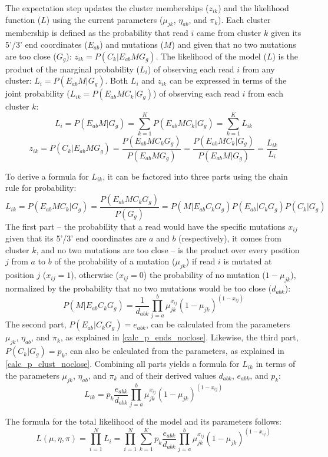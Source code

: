 \documentclass[../../MainTexts/main.tex]{subfiles}
\begin{document}
The expectation step updates the cluster memberships ($z_{ik}$) and the likelihood function ($L$) using the current parameters ($\mu_{jk}$, $\eta_{ab}$, and $\pi_k$).
Each cluster membership is defined as the probability that read $i$ came from cluster $k$ given its 5'/3' end coordinates ($E_{ab}$) and mutations ($M$) and given that no two mutations are too close ($G_g$): $z_{ik} = P(C_k | E_{ab} M G_g)$.
The likelihood of the model ($L$) is the product of the marginal probability ($L_i$) of observing each read $i$ from any cluster: $L_i = P(E_{ab} M | G_g)$.
Both $L_i$ and $z_{ik}$ can be expressed in terms of the joint probability ($L_{ik} = P(E_{ab} M C_k | G_g)$) of observing each read $i$ from each cluster $k$:
$$L_i = P(E_{ab} M | G_g) = \sum_{k=1}^K P(E_{ab} M C_k | G_g) = \sum_{k=1}^K L_{ik}$$
$$z_{ik} = P(C_k | E_{ab} M G_g) = \frac{P(E_{ab} M C_k G_g)}{P(E_{ab} M G_g)} = \frac{P(E_{ab} M C_k | G_g)}{P(E_{ab} M | G_g)} = \frac{L_{ik}}{L_i}$$

To derive a formula for $L_{ik}$, it can be factored into three parts using the chain rule for probability:
$$L_{ik} = P(E_{ab} M C_k | G_g) = \frac{P(E_{ab} M C_k G_g)}{P(G_g)} = P(M | E_{ab} C_k G_g) P(E_{ab} | C_k G_g) P(C_k | G_g)$$
The first part -- the probability that a read would have the specific mutations $x_{ij}$ given that its 5'/3' end coordinates are $a$ and $b$ (respectively), it comes from cluster $k$, and no two mutations are too close -- is the product over every position $j$ from $a$ to $b$ of the probability of a mutation ($\mu_{jk}$) if read $i$ is mutated at position $j$ ($x_{ij} = 1$), otherwise ($x_{ij} = 0$) the probability of no mutation ($1 - \mu_{jk}$), normalized by the probability that no two mutations would be too close ($d_{abk}$):
$$P(M | E_{ab} C_k G_g) = \frac{1}{d_{abk}} \prod_{j=a}^{b} \mu_{jk}^{x_{ij}} (1 - \mu_{jk})^{(1 - x_{ij})}$$
The second part, $P(E_{ab} | C_k G_g) = e_{abk}$, can be calculated from the parameters $\mu_{jk}$, $\eta_{ab}$, and $\pi_k$, as explained in \ref{calc_p_ends_noclose}.
Likewise, the third part, $P(C_k | G_g) = p_k$, can also be calculated from the parameters, as explained in \ref{calc_p_clust_noclose}.
Combining all parts yields a formula for $L_{ik}$ in terms of the parameters $\mu_{jk}$, $\eta_{ab}$, and $\pi_k$ and of their derived values $d_{abk}$, $e_{abk}$, and $p_k$:
$$L_{ik} = p_k \frac{e_{abk}}{d_{abk}} \prod_{j=a}^{b} \mu_{jk}^{x_{ij}} (1 - \mu_{jk})^{(1 - x_{ij})}$$

The formula for the total likelihood of the model and its parameters follows:
$$L(\mu, \eta, \pi) = \prod_{i=1}^{N} L_i = \prod_{i=1}^{N} \sum_{k=1}^{K} p_k \frac{e_{abk}}{d_{abk}} \prod_{j=a}^{b} \mu_{jk}^{x_{ij}} (1 - \mu_{jk})^{(1 - x_{ij})}$$
\end{document}
